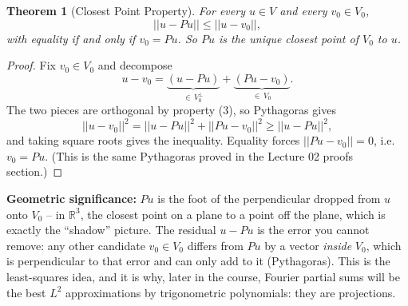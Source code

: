 \documentclass[11pt]{article}
\newcommand{\1}{\mathbf{1}}
\theoremstyle{notestyle}
\newtheorem{theorem}{Theorem}[section]
\theoremstyle{definition}
\begin{document}
\begin{theorem}[Closest Point Property]
\label{thm:closest-point}
For every $u \in V$ and every $v_0 \in V_0$,
$$||u - Pu|| \le ||u - v_0||,$$
with equality if and only if $v_0 = Pu$. So $Pu$ is the \emph{unique} closest
point of $V_0$ to $u$.
\end{theorem}
\begin{proof}
Fix $v_0 \in V_0$ and decompose
$$u - v_0 = \underbrace{(u - Pu)}_{\in \, V_0^{\perp}} +
\underbrace{(Pu - v_0)}_{\in \, V_0}.$$
The two pieces are orthogonal by property (3), so Pythagoras gives
$$||u - v_0||^2 = ||u - Pu||^2 + ||Pu - v_0||^2 \ge ||u - Pu||^2,$$
and taking square roots gives the inequality. Equality forces $||Pu - v_0|| =
0$, i.e.\ $v_0 = Pu$. (This is the same Pythagoras proved in the Lecture 02
proofs section.)
\end{proof}
\par \textbf{Geometric significance:} $Pu$ is the foot of the perpendicular
dropped from $u$ onto $V_0$ -- in $\mathbb{R}^3$, the closest point on a plane to
a point off the plane, which is exactly the ``shadow'' picture. The residual $u -
Pu$ is the error you cannot remove: any other candidate $v_0 \in V_0$ differs
from $Pu$ by a vector \emph{inside} $V_0$, which is perpendicular to that error
and can only add to it (Pythagoras). This is the least-squares idea, and it is
why, later in the course, Fourier partial sums will be the best $L^2$
approximations by trigonometric polynomials: they are projections.
\end{document}
